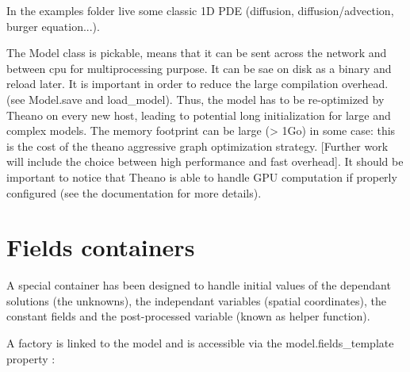 \documentclass[letterpaper,10pt,english]{sphinxmanual}
\begin{document}
In the examples folder live some classic 1D PDE (diffusion, diffusion/advection, burger equation...).

The Model class is pickable, means that it can be sent across the network and between cpu for multiprocessing purpose. It can be sae on disk as a binary and reload later. It is important in order to reduce the large compilation overhead. (see Model.save and load\_model). Thus, the model has to be re-optimized by Theano on every new host, leading to potential long initialization for large and complex models. The memory footprint can be large (\textgreater{} 1Go) in some case: this is the cost of the theano aggressive graph optimization strategy. {[}Further work will include the choice between high performance and fast overhead{]}. It should be important to notice that Theano is able to handle GPU computation if properly configured (see the  documentation for more details).


\section{Fields containers}
\label{\detokenize{overview:fields-containers}}
A special container has been designed to handle initial values of the dependant solutions (the unknowns), the independant variables (spatial coordinates), the constant fields and the post-processed variable (known as helper function).

A factory is linked to the model and is accessible via the model.fields\_template property :

\begin{sphinxVerbatim}[commandchars=\\\{\}]
   
   

  
              \PYG{p}{[} \PYG{p}{]}

      
        
   
\end{sphinxVerbatim}
\end{document}
